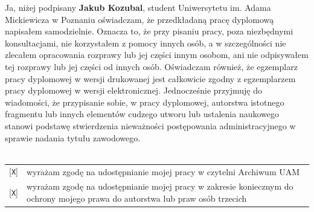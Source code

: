 \documentclass[oneside,polski,logo]{amuthesis}
\begin{document}
Ja, niżej podpisany \textbf{Jakub Kozubal}, student Uniwersytetu im. Adama Mickiewicza w Poznaniu oświadczam, że przedkładaną pracę dyplomową napisałem samodzielnie.
Oznacza to, że przy pisaniu pracy, poza niezbędnymi konsultacjami, nie korzystałem z pomocy innych osób, a w szczególności nie zlecałem opracowania rozprawy lub jej części innym osobom, ani nie odpisywałem tej rozprawy lub jej części od innych osób.
Oświadczam również, że egzemplarz pracy dyplomowej w wersji drukowanej jest całkowicie zgodny z egzemplarzem pracy dyplomowej w wersji elektronicznej.
Jednocześnie przyjmuję do wiadomości, że przypisanie sobie, w pracy dyplomowej, autorstwa istotnego fragmentu lub innych elementów cudzego utworu lub ustalenia naukowego stanowi podstawę stwierdzenia nieważności postępowania administracyjnego w sprawie nadania tytułu zawodowego.
  \vspace{2cm}%
  \\ \\
  \small\noindent\begin{tabularx}{\textwidth}{@{}lX}
  {[\texttt{\uppercase{X}}]} & wyra\.zam zgod\k{e} na udost\k{e}pnianie mojej pracy w czytelni Archiwum UAM\\[1ex]
  {[\texttt{\uppercase{X}}]} & wyra\.zam zgod\k{e} na udost\k{e}pnianie mojej pracy w zakresie koniecznym do ochrony mojego prawa do autorstwa lub praw os\'ob trzecich\\
  \end{tabularx}
\clearpage
\end{document}
